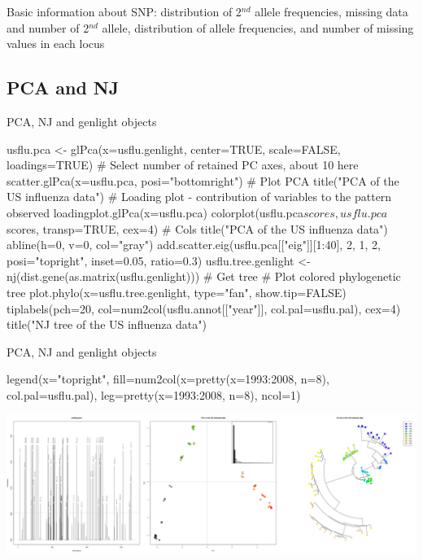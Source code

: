 \documentclass[compress, ucs, xelatex, 11pt, xcolor=svgnames, aspectratio=169,
	hyperref={
		bookmarks=true,
		unicode=true,
		colorlinks=true,
		pdftitle={Molecular data in R},
		plainpages=false,
		pdfauthor={Vojtech Zeisek},
		pdfsubject={Course about phylogeny and evolution in R},
		pdfcreator={XeLaTeX},
		pdfkeywords={R, evolution, phylogeny, molecular data},
		linkcolor=Crimson, %
		anchorcolor=Magenta, %
		citecolor=Magenta, %
		filecolor=Magenta, %
		menucolor=Magenta, %
		urlcolor=DodgerBlue, %
		pdftex},
	url={hyphens, lowtilde} %
	]{beamer}
\renewcommand{\texttt}[1]{\colorbox{Beige}{{\ttfamily #1}}}
\begin{document}
\begin{frame}{Basic information about SNP: distribution of 2$^{nd}$ allele frequencies, missing data and number of 2$^{nd}$ allele, distribution of allele frequencies, and number of missing values in each locus}
	\begin{center}
		\texttt{[image: flu\_alleles.png]}
	\end{center}
\end{frame}

\subsection{PCA and NJ}

\begin{frame}[fragile]{PCA, NJ and genlight objects}
	\begin{spluscode}
    usflu.pca <- glPca(x=usflu.genlight, center=TRUE, scale=FALSE,
      loadings=TRUE) # Select number of retained PC axes, about 10 here
    scatter.glPca(x=usflu.pca, posi="bottomright") # Plot PCA
    title("PCA of the US influenza data")
    # Loading plot - contribution of variables to the pattern observed
    loadingplot.glPca(x=usflu.pca)
    colorplot(usflu.pca$scores, usflu.pca$scores, transp=TRUE, cex=4) # Cols
    title("PCA of the US influenza data")
    abline(h=0, v=0, col="gray")
    add.scatter.eig(usflu.pca[["eig"]][1:40], 2, 1, 2, posi="topright",
      inset=0.05, ratio=0.3)
    usflu.tree.genlight <- nj(dist.gene(as.matrix(usflu.genlight))) # Get tree
    # Plot colored phylogenetic tree
    plot.phylo(x=usflu.tree.genlight, type="fan", show.tip=FALSE)
    tiplabels(pch=20, col=num2col(usflu.annot[["year"]], col.pal=usflu.pal),
      cex=4)
    title("NJ tree of the US influenza data")
	\end{spluscode}
\end{frame}

\begin{frame}[fragile]{PCA, NJ and genlight objects}
	\begin{spluscode}
    legend(x="topright", fill=num2col(x=pretty(x=1993:2008, n=8),
      col.pal=usflu.pal), leg=pretty(x=1993:2008, n=8), ncol=1)
	\end{spluscode}
	\begin{center}
		\includegraphics[width=\textwidth]{flu_pcoa_nj.png}
	\end{center}
\end{frame}
\end{document}
